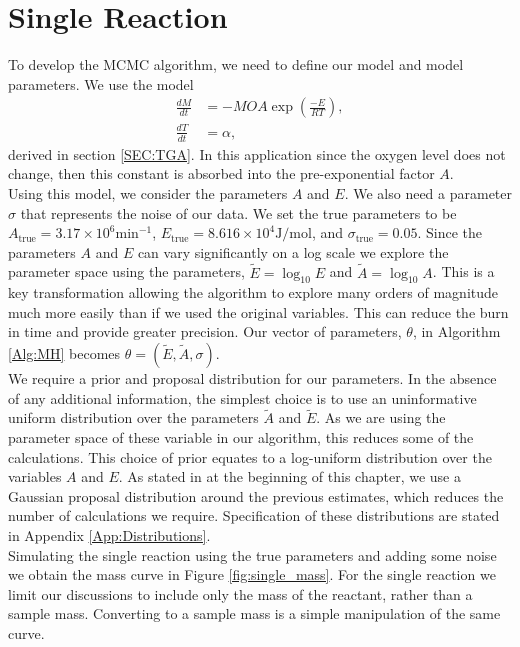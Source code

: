\section{Single Reaction}
\label{Sec:1R}
To develop the MCMC algorithm, we need to define our model and model parameters. We use the model
\begin{align}
\frac{dM}{dt}&=-MOA\exp\left(\frac{-E}{RT}\right), \label{TGA_system_BI} \\
\frac{dT}{dt}&=\alpha, \label{TGA_system2_BI}
\end{align}
derived in section \ref{SEC:TGA}. In this application since the oxygen level does not change, then this constant is absorbed into the pre-exponential factor $A$.\\
Using this model, we consider the parameters $A$ and $E$. We also need a parameter $\sigma$ that represents the noise of our data. We set the true parameters to be $A_{\text{true}}=3.17\times10^6 \text{min}^{-1}$, $E_{\text{true}}=8.616\times 10^4 \text{J}/\text{mol}$, and $\sigma_{\text{true}}=0.05$. Since the parameters $A$ and $E$ can vary significantly on a log scale we explore the parameter space using the parameters, $\tilde{E}=\log_{10}E$ and $\tilde{A}=\log_{10}A$. This is a key transformation allowing the algorithm to explore many orders of magnitude much more easily than if we used the original variables. This can reduce the burn in time and provide greater precision. Our vector of parameters, $\theta$, in Algorithm \ref{Alg:MH} becomes $\theta=\left(\tilde{E},\tilde{A},\sigma\right)$.\\
We require a prior and proposal distribution for our parameters. In the absence of any additional information, the simplest choice is to use an uninformative uniform distribution over the parameters $\tilde{A}$ and $\tilde{E}$. As we are using the parameter space of these variable in our algorithm, this reduces some of the calculations. This choice of prior equates to a log-uniform distribution over the variables $A$ and $E$. As stated in at the beginning of this chapter, we use a Gaussian proposal distribution around the previous estimates, which reduces the number of calculations we require. Specification of these distributions are stated in Appendix \ref{App:Distributions}.\\
Simulating the single reaction using the true parameters and adding some noise we obtain the mass curve in Figure \ref{fig:single_mass}. For the single reaction we limit our discussions to include only the mass of the reactant, rather than a sample mass. Converting to a sample mass is a simple manipulation of the same curve.\\
